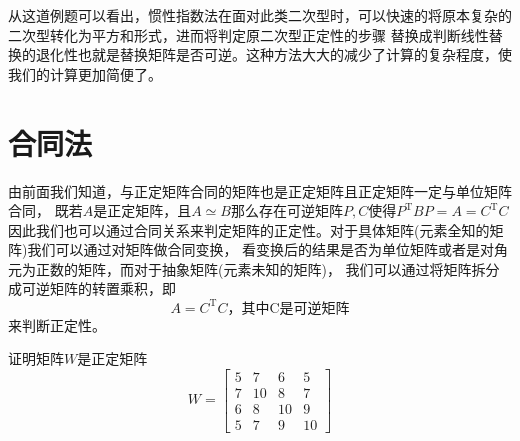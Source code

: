 从这道例题可以看出，惯性指数法在面对此类二次型时，可以快速的将原本复杂的二次型转化为平方和形式，进而将判定原二次型正定性的步骤
替换成判断线性替换的退化性也就是替换矩阵是否可逆。这种方法大大的减少了计算的复杂程度，使我们的计算更加简便了。
\section{合同法}
由前面我们知道，与正定矩阵合同的矩阵也是正定矩阵且正定矩阵一定与单位矩阵合同，
既若$A$是正定矩阵，且$A\simeq B$那么存在可逆矩阵$P,C$使得$P^\mathrm{T}BP=A=C^\mathrm{T}C$
因此我们也可以通过合同关系来判定矩阵的正定性。对于具体矩阵(元素全知的矩阵)我们可以通过对矩阵做合同变换，
看变换后的结果是否为单位矩阵或者是对角元为正数的矩阵，而对于抽象矩阵(元素未知的矩阵)，
我们可以通过将矩阵拆分成可逆矩阵的转置乘积，即$$A=C^\mathrm{T}C，\text{其中C是可逆矩阵}$$来判断正定性。
\begin{example}[Wilson测试矩阵]  
证明矩阵$W$是正定矩阵\[
W = \begin{bmatrix}
5 & 7 & 6 & 5 \\
7 & 10 & 8 & 7 \\
6 & 8 & 10 & 9 \\
5 & 7 & 9 & 10
\end{bmatrix}
\]
\end{example}
